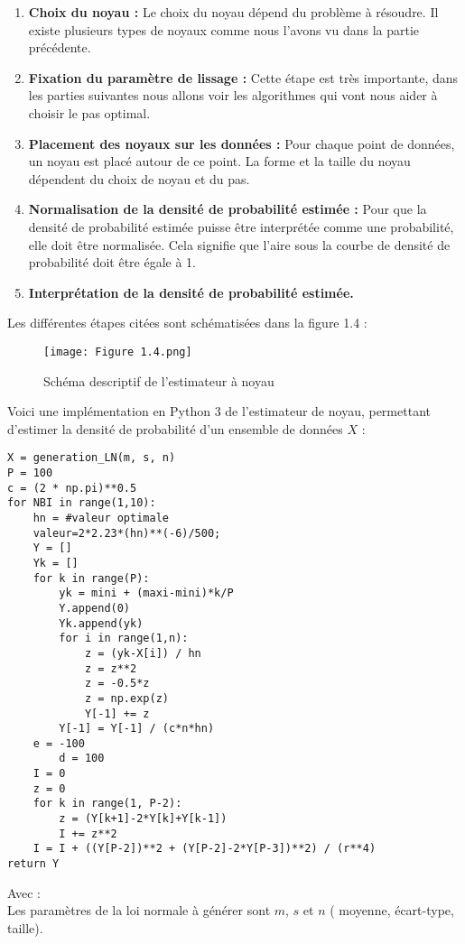 \begin{enumerate}
\item \textbf{ Choix du noyau :}
Le choix du noyau dépend du problème à résoudre. Il existe plusieurs types de noyaux comme nous l'avons vu dans la partie précédente.

\item \textbf{ Fixation du paramètre de lissage :}
Cette étape est très importante, dans les parties suivantes nous allons voir les algorithmes qui vont nous aider à choisir le pas optimal.

\item \textbf{ Placement des noyaux sur les données :}
Pour chaque point de données, un noyau est placé autour de ce point. La forme et la taille du noyau dépendent du choix de noyau et du pas.

\item \textbf{ Normalisation de la densité de probabilité estimée :}
Pour que la densité de probabilité estimée puisse être interprétée comme une probabilité, elle doit être normalisée. Cela signifie que l'aire sous la courbe de densité de probabilité doit être égale à 1.

\item \textbf{Interprétation de la densité de probabilité estimée.}
\end{enumerate}
Les différentes étapes citées sont schématisées dans la figure 1.4 : 
\begin{figure}[!ht]
  \centering
  \texttt{[image: Figure 1.4.png]}
  \caption{Schéma descriptif de l'estimateur à noyau}
  \label{fig:Schéma descriptif de l'estimateur à noyau}
\end{figure}
\newpage
Voici une implémentation en Python 3 de l'estimateur de noyau, permettant d’estimer la densité de probabilité d'un ensemble de données $X$ : \\
\begin{lstlisting}
X = generation_LN(m, s, n) 
P = 100
c = (2 * np.pi)**0.5
for NBI in range(1,10):
    hn = #valeur optimale
    valeur=2*2.23*(hn)**(-6)/500;
    Y = []
    Yk = []
    for k in range(P):
        yk = mini + (maxi-mini)*k/P
        Y.append(0)
        Yk.append(yk)
        for i in range(1,n):
            z = (yk-X[i]) / hn
            z = z**2
            z = -0.5*z
            z = np.exp(z)
            Y[-1] += z
        Y[-1] = Y[-1] / (c*n*hn)
    e = -100
        d = 100
    I = 0
    z = 0
    for k in range(1, P-2):
        z = (Y[k+1]-2*Y[k]+Y[k-1])
        I += z**2
    I = I + ((Y[P-2])**2 + (Y[P-2]-2*Y[P-3])**2) / (r**4)
return Y

\end{lstlisting}
Avec : \\
Les paramètres de la loi normale à générer sont $m$, $s$ et $n$ ( moyenne, écart-type, taille).
\newpage
